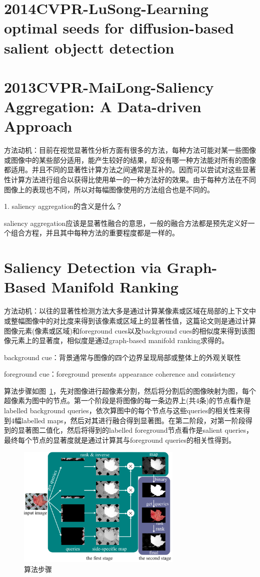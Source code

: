 \documentclass[12pt]{article}
\begin{document}
\section{2014CVPR-LuSong-Learning optimal seeds for diffusion-based salient objectt detection}

\section{2013CVPR-MaiLong-Saliency Aggregation: A Data-driven Approach}

方法动机：目前在视觉显著性分析方面有很多的方法，每种方法可能对某一些图像或图像中的某些部分适用，能产生较好的结果，却没有哪一种方法能对所有的图像都适用。并且不同的显著性计算方法之间通常是互补的。因而可以尝试对这些显著性计算方法进行组合以获得比使用单一的一种方法好的效果。由于每种方法在不同图像上的表现也不同，所以对每幅图像使用的方法组合也是不同的。

1. saliency aggregation的含义是什么？

saliency aggregation应该是显著性融合的意思，一般的融合方法都是预先定义好一个组合方程，并且其中每种方法的重要程度都是一样的。

\section{Saliency Detection via Graph-Based Manifold Ranking}

方法动机：以往的显著性检测方法大多是通过计算某像素或区域在局部的上下文中或整幅图像中的对比度来得到该像素或区域上的显著性值，这篇论文则是通过计算图像元素(像素或区域)和foreground cues以及background cues的相似度来得到该图像元素上的显著度，相似度是通过graph-based manifold ranking求得的。

background cue：背景通常与图像的四个边界呈现局部或整体上的外观关联性

foreground cue：foreground presents appearance coherence and consistency

算法步骤如图~\ref{fig: MR1}，先对图像进行超像素分割，然后将分割后的图像映射为图，每个超像素为图中的节点。第一个阶段是将图像的每一条边界上(共4条)的节点看作是labelled background queries，依次算图中的每个节点与这些queries的相关性来得到4幅labelled maps，然后对其进行融合得到显著图。在第二阶段，对第一阶段得到的显著图二值化，然后将得到的labelled foreground节点看作是salient queries，最终每个节点的显著度就是通过计算其与foreground queries的相关性得到。
\begin{figure}[!ht]
\centering
\includegraphics[width=0.7\textwidth]{MR1.png}
\caption{算法步骤}
\label{fig: MR1}
\end{figure}
\end{document}
